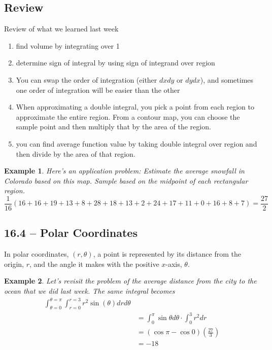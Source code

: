 \documentclass[11pt]{article}
\newtheorem{ex}{Example}
\begin{document}
\subsection{Review}
Review of what we learned last week
\begin{enumerate}
  \item find volume by integrating over 1
  \item determine sign of integral by using sign of integrand over region
  \item You can swap the order of integration (either $dx dy$ or $dy dx$), and sometimes
    one order of integration will be easier than the other
  \item When approximating a double integral, you pick a point from each region to approximate the
    entire region. From a contour map, you can choose the sample point and then multiply that
    by the area of the region.
  \item you can find average function value by taking double integral over region and
    then divide by the area of that region.
\end{enumerate}
\begin{ex}
  Here's an application problem:
  Estimate the average snowfall in Colorado based on this map. Sample based on the midpoint of each rectangular region.
  \[\frac{1}{16}(16+16+19+13+8+28+18+13+2+24+17+11+0+16+8+7) = \frac{27}{2}\]
\end{ex}
\subsection{16.4 -- Polar Coordinates}
In polar coordinates, $(r, \theta)$, a point is represented by its distance from the origin, $r$, and the angle it makes with the positive $x$-axis, $\theta$.


\begin{ex}
Let's revisit the problem of the average distance from the city to the ocean that we did
last week.
The same integral becomes
\begin{align*}
\int_{\theta = 0}^{\theta = \pi} \int_{r=0}^{r=3} r^2 \sin(\theta) dr d\theta \\
&= \int_0^\pi \sin \theta d\theta \cdot \int_0^3 r^2 dr\\
&= (\cos \pi - \cos 0)(\frac{27}{3})\\
&= -18
\end{align*}
\end{ex}
\end{document}
